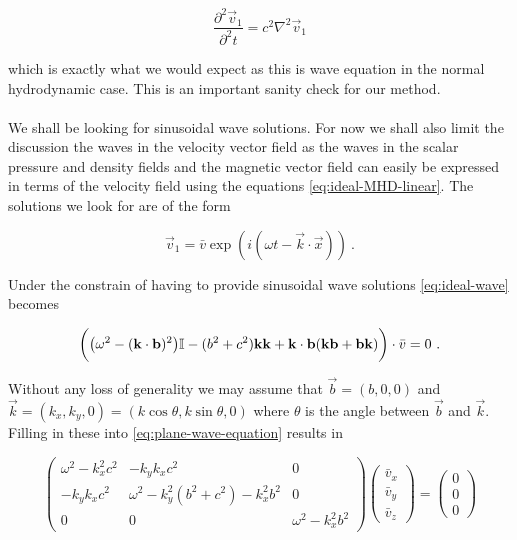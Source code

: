 $$ \frac{\partial^2 \vec{v}_1}{\partial^2 t} = c^2 \nabla^2 \vec{v}_1 $$

which is exactly what we would expect as this is wave equation in the normal hydrodynamic case. This is an important sanity check for our method.\\
\\

We shall be looking for sinusoidal wave solutions. For now we shall also limit the discussion the waves in the velocity vector field as the waves in the scalar pressure and density fields and the magnetic vector field can easily be expressed in terms of the velocity field using the equations \autoref{eq:ideal-MHD-linear}. The solutions we look for are of the form

$$ \vec{v}_1 = \bar{v} \exp(i(\omega t - \vec{k} \cdot \vec{x})) \ .$$ 

Under the constrain of having to provide sinusoidal wave solutions \autoref{eq:ideal-wave} becomes

\begin{equation}
\label{eq:plane-wave-equation}
\bigg( \big( \omega^2 - (\mathbf{k}\cdot \mathbf{b})^2 \big) \mathbb{I} - (b^2 + c^2)\mathbf{k}\mathbf{k} + \mathbf{k} \cdot \mathbf{b}(\mathbf{k}\mathbf{b} + \mathbf{b}\mathbf{k}) \bigg) \cdot \bar{v} = 0 \ .
\end{equation} 

Without any loss of generality we may assume that $\vec{b} = (b,0,0)$ and $\vec{k} = (k_x, k_y, 0) = (k\cos\theta, k\sin\theta, 0)$ where $\theta$ is the angle between $\vec{b}$ and $\vec{k}$. Filling in these into \autoref{eq:plane-wave-equation} results in

\begin{equation}
\label{eq:plane-wave-equation-matrixform}
\begin{pmatrix}
 \omega^ 2-k_x^2 c^2  &  - k_y k_x c^2  & 0\\
- k_y k_x c^2  &  \omega^2  - k_y^2 (b^2 + c^2) - k_x^2 b^2  &  0\\
0  &  0  & \omega^2  -  k_x^2 b^2
\end{pmatrix}
\begin{pmatrix}
\bar{v}_x \\
\bar{v}_y \\
\bar{v}_z
\end{pmatrix}
 = 
\begin{pmatrix}
0 \\
0 \\
0
\end{pmatrix}
\end{equation} 


